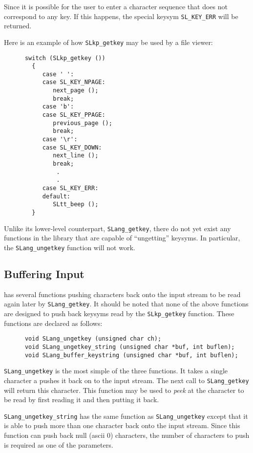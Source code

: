   Since it is possible for the user to enter a character sequence that
  does not correspond to any key.  If this happens, the special keysym
  \verb|SL_KEY_ERR| will be returned.
  
  Here is an example of how \verb|SLkp_getkey| may be used by a file
  viewer:
\begin{verbatim} 
      switch (SLkp_getkey ())
        {
           case ' ':
           case SL_KEY_NPAGE:
              next_page ();
              break;
           case 'b':
           case SL_KEY_PPAGE:
              previous_page ();
              break;
           case '\r':
           case SL_KEY_DOWN:
              next_line ();
              break;
               .
               .
           case SL_KEY_ERR:
           default:
              SLtt_beep ();
        }
\end{verbatim} 
   
   Unlike its lower-level counterpart, \verb|SLang_getkey|, there do
   not yet exist any functions in the library that are capable of
   ``ungetting'' keysyms.  In particular, the \verb|SLang_ungetkey|
   function will not work.
   

\subsection{Buffering Input} %

  \slang{} has several functions pushing characters back onto the
  input stream to be read again later by \verb|SLang_getkey|.  It
  should be noted that none of the above functions are designed to
  push back keysyms read by the \verb|SLkp_getkey| function.  These
  functions are declared as follows:
\begin{verbatim}
      void SLang_ungetkey (unsigned char ch);
      void SLang_ungetkey_string (unsigned char *buf, int buflen);
      void SLang_buffer_keystring (unsigned char *buf, int buflen);
\end{verbatim}

  \verb|SLang_ungetkey| is the most simple of the three functions.  It takes
  a single character a pushes it back on to the input stream.  The next call to
  \verb|SLang_getkey| will return this character.  This function may be used
  to {\em peek} at the character to be read by first reading it and then
  putting it back.

  \verb|SLang_ungetkey_string| has the same function as
  \verb|SLang_ungetkey| except that it is able to push more than one
  character back onto the input stream.  Since this function can push back
  null (ascii 0) characters, the number of characters to push is required as
  one of the parameters.

